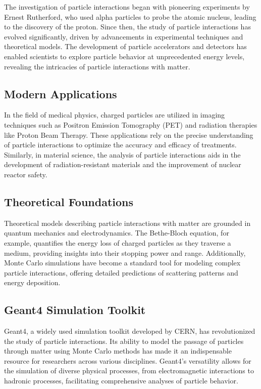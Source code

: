 \documentclass{article}
\begin{document}
The investigation of particle interactions began with pioneering experiments by Ernest Rutherford, who used alpha particles to probe the atomic nucleus, leading to the discovery of the proton. Since then, the study of particle interactions has evolved significantly, driven by advancements in experimental techniques and theoretical models. The development of particle accelerators and detectors has enabled scientists to explore particle behavior at unprecedented energy levels, revealing the intricacies of particle interactions with matter.

\subsection{Modern Applications}

In the field of medical physics, charged particles are utilized in imaging techniques such as Positron Emission Tomography (PET) and radiation therapies like Proton Beam Therapy. These applications rely on the precise understanding of particle interactions to optimize the accuracy and efficacy of treatments. Similarly, in material science, the analysis of particle interactions aids in the development of radiation-resistant materials and the improvement of nuclear reactor safety.

\subsection{Theoretical Foundations}

Theoretical models describing particle interactions with matter are grounded in quantum mechanics and electrodynamics. The Bethe-Bloch equation, for example, quantifies the energy loss of charged particles as they traverse a medium, providing insights into their stopping power and range. Additionally, Monte Carlo simulations have become a standard tool for modeling complex particle interactions, offering detailed predictions of scattering patterns and energy deposition.

\subsection{Geant4 Simulation Toolkit}

Geant4, a widely used simulation toolkit developed by CERN, has revolutionized the study of particle interactions. Its ability to model the passage of particles through matter using Monte Carlo methods has made it an indispensable resource for researchers across various disciplines. Geant4's versatility allows for the simulation of diverse physical processes, from electromagnetic interactions to hadronic processes, facilitating comprehensive analyses of particle behavior.
\end{document}
